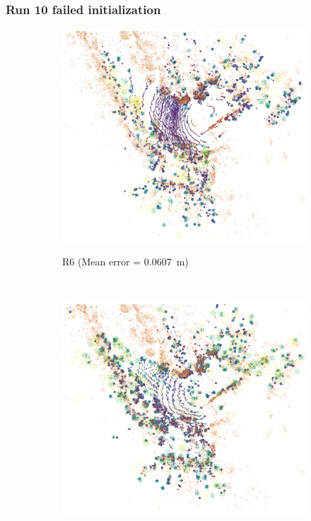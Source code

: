 \subsubsection{Run 10 failed initialization}
\label{sec:laverdiere_fail}

\lightlipsum[1]

\begin{figure}[tpbh!]
	\begin{center}
		\begin{subfigure}[b]{0.3\textwidth}
			\includegraphics[width=\linewidth]{figs/run10_init_fail/run_6.pdf}
			\label{fig:r6_pcl}
			\caption{R6 (Mean error = \SI{0.0607}{m})}
			\vspace{0.2in}
		\end{subfigure}%
		~
		\begin{subfigure}[b]{0.3\textwidth}
			\includegraphics[width=\linewidth]{figs/run10_init_fail/run_10.pdf}

\end{subfigure}
\end{center}
\end{figure}
